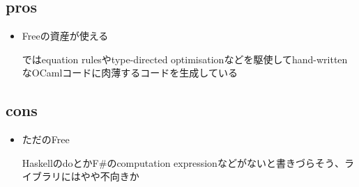 \subsection*{pros}
\begin{frame}
  \frametitlesubs

  \begin{itemize}
    \item[\coloremoji{😁}] Freeの資産が使える

      \cite{pretnar2017efficient}ではequation rulesやtype-directed optimisationなどを駆使してhand-writtenなOCamlコードに肉薄するコードを生成している

  \end{itemize}
\end{frame}

\subsection*{cons}
\begin{frame}
  \frametitlesubs

  \begin{itemize}
    \item[\coloremoji{😅}] ただのFree

      HaskellのdoとかF\#のcomputation expressionなどがないと書きづらそう、ライブラリにはやや不向きか
  \end{itemize}
\end{frame}
